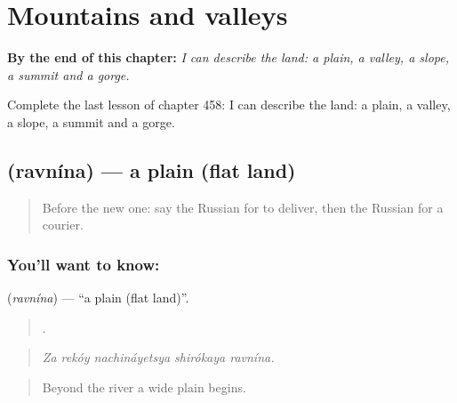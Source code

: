 
\chapter{Mountains and valleys}
\label{ch:ru-mountains-and-valleys}

\begin{chapteropening}
\textbf{By the end of this chapter:} \emph{I can describe the land: a plain, a valley, a slope, a summit and a gorge.}

Complete the last lesson of chapter 458: I can describe the land: a plain, a valley, a slope, a summit and a gorge.
\end{chapteropening}

\section[\texorpdfstring{\ru{равнина} (ravnína)}{равнина (ravnína)}]{ (ravnína) — a plain (flat land)}

\label{lesson:RU-C458-ravnina}



\begin{quote}
Before the new one: say the Russian for to deliver, then the Russian for a courier.
\end{quote}

\subsection*{You'll want to know: }
\textbf{} (\emph{ravnína}) — \textquotedblleft{}a plain (flat land)\textquotedblright{}.

\begin{quote}
    .
\end{quote}

\begin{quote}
\emph{Za rekóy nachináyetsya shirókaya ravnína.}
\end{quote}

\begin{quote}
Beyond the river a wide plain begins.
\end{quote}

